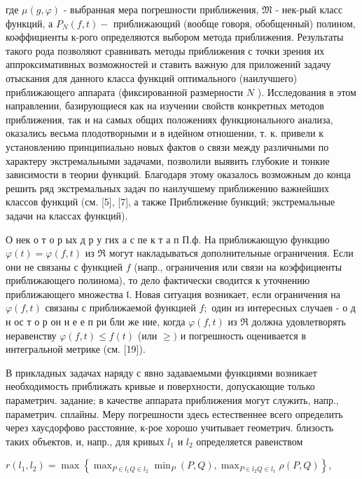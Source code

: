 \documentclass[10pt]{article}
\begin{document}
где $\mu(g, \varphi)$ - выбранная мера погрешности приближения, $\mathfrak{M}$ - нек-рый класс функций, а $P_{N}(f, t)-$ приближающий (вообще говоря, обобщенный) полином, коәффициенты к-рого определяются выбором метода приближения. Результаты такого рода позволяют сравнивать методы приближения с точки зрения их аппроксимативных возможностей и ставить важную для приложений задачу отыскания для данного класса функций оптимального (наилучшего) приближающего аппарата (фиксированной размерности $N$ ). Исследования в этом направлении, базирующиеся как на изучении свойств конкретных методов приближения, так и на самых общих положениях функционального анализа, оказались весьма плодотворными и в идейном отношении, т. к. привели к установлению принципиально новых фактов о связи между различными по характеру экстремальными задачами, позволили выявить глубокие и тонкие зависимости в теории функций. Благодаря этому оказалось возможным до конца решить ряд экстремальных задач по наилучшему приближению важнейших классов функций (см. [5], [7], а также Приближение бункций; экстремальные задачи на классах функций).



О нек о т о р ых д р у гих а с пе к т а п П.ф. На приближающую функцию $\varphi(t)=\varphi(f, t)$ из $\mathfrak{\Re}$ могут накладываться дополнительные ограничения. Если они не связаны с функцией $f$ (напр., ограничения или связи на коэффициенты приближающего полинома), то дело фактически сводится к уточнению приближающего множества $\mathfrak{l}$. Новая ситуация возникает, если ограничения на $\varphi(f, t)$ связаны с приближаемой функцией $f ;$ один из интересных случаев - о д н ос т о р он н е е п ри бли же ние, когда $\varphi(f, t)$ из $\mathfrak{R}$ должна удовлетворять неравенству $\varphi(f, t) \leqslant f(t)$ (или $\geqslant)$ и погрешность оценивается в интегральной метрике (см. [19]).



В прикладных задачах наряду с явно задаваемыми функциями возникает необходимость приближать кривые и поверхности, допускающие только параметрич. задание; в качестве аппарата приближения могут служить, напр., параметрич. сплайны. Меру погрешности здесь естественнее всего определить через хаусдорфово расстояние, к-рое хорошо учитывает геометрич. близость таких объектов, и, напр., для кривых $l_{1}$ и $l_{2}$ определяется равенством



$r\left(l_{1}, l_{2}\right)=\max \left\{\max _{P \in l_{1} Q \in l_{2}} \min _{P}(P, Q), \max _{P \in l_{2} Q \in l_{1}} \rho(P, Q)\right\}$,
\end{document}
